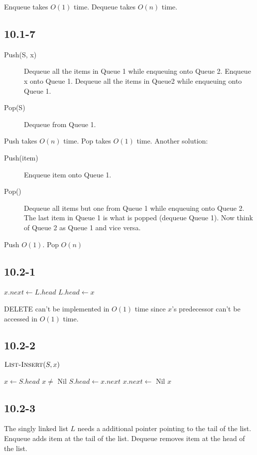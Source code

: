 \documentclass{book}
\begin{document}
\begin{CJK}{UTF8}{gkai}
Enqueue takes $O(1)$ time. Dequeue takes $O(n)$ time.

\subsection*{10.1-7}
\begin{description}
\item[Push(S, x)] Dequeue all the items in Queue 1 while enqueuing onto Queue 2.  
Enqueue x onto Queue 1. Dequeue all the items in Queue2 while enqueuing onto 
Queue 1.
\item[Pop(S)] Dequeue from Queue 1. \end{description}

Push takes $O(n)$ time. Pop takes $O(1)$ time.
Another solution:
\begin{description}
\item[Push(item)]	Enqueue item onto Queue 1.
\item[Pop()] Dequeue all items but one from Queue 1 while enqueuing onto Queue 
2. The last item in Queue 1 is what is popped (dequeue Queue 1). Now think of 
   Queue 2 as Queue 1 and vice versa.
\end{description}
Push $O(1)$.	Pop	$O(n)$

\subsection*{10.2-1}
\begin{codebox}
\li $x.next \gets L.head$
\li $L.head \gets x$
\end{codebox}
DELETE can't be implemented in $O(1)$ time since $x$'s predecessor can't be 
accessed in $O(1)$ time.

\subsection*{10.2-2}

\begin{codebox}
\li $\textnormal{\scshape List-Insert}(S, x)$
\end{codebox}

\begin{codebox}
\li $x \gets S.head$
\li \If $x \ne $ Nil
\li \Then $S.head \gets x.next$
\End
\li $x.next \gets $ Nil
\li \Return $x$
\end{codebox}

\subsection*{10.2-3}
The singly linked list $L$ needs a additional pointer pointing to the tail of 
the list. Enqueue adds item at the tail of the list. Dequeue removes item at the 
head of the list.


\end{CJK}
\end{document}
